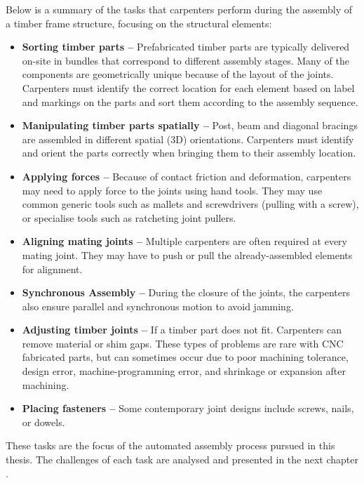 Below is a summary of the tasks that carpenters perform during the assembly of a timber frame structure, focusing on the structural elements:

\begin{itemize}
	\item \textbf{Sorting timber parts --} Prefabricated timber parts are typically delivered on-site in bundles that correspond to different assembly stages. Many of the components are geometrically unique because of the layout of the joints. Carpenters must identify the correct location for each element based on label and markings on the parts and sort them according to the assembly sequence.

	\item \textbf{Manipulating timber parts spatially --} Post, beam and diagonal bracings are assembled in different spatial (3D) orientations. Carpenters must identify and orient the parts correctly when bringing them to their assembly location.

	\item \textbf{Applying forces --} Because of contact friction and deformation, carpenters may need to apply force to the joints using hand tools. They may use common generic tools such as mallets and screwdrivers (pulling with a screw), or specialise tools such as ratcheting joint pullers. 

	\item \textbf{Aligning mating joints --} Multiple carpenters are often required at every mating joint. They may have to push or pull the already-assembled elements for alignment. 

	\item \textbf{Synchronous Assembly --} During the closure of the joints, the carpenters also ensure parallel and synchronous motion to avoid jamming.

	\item \textbf{Adjusting timber joints --} If a timber part does not fit. Carpenters can remove material or shim gaps. These types of problems are rare with CNC fabricated parts, but can sometimes occur due to poor machining tolerance, design error, machine-programming error, and shrinkage or expansion after machining.

	\item \textbf{Placing fasteners --} Some contemporary joint designs include screws, nails, or dowels.

\end{itemize}

These tasks are the focus of the automated assembly process pursued in this thesis. The challenges of each task are analysed and presented in the next chapter .

